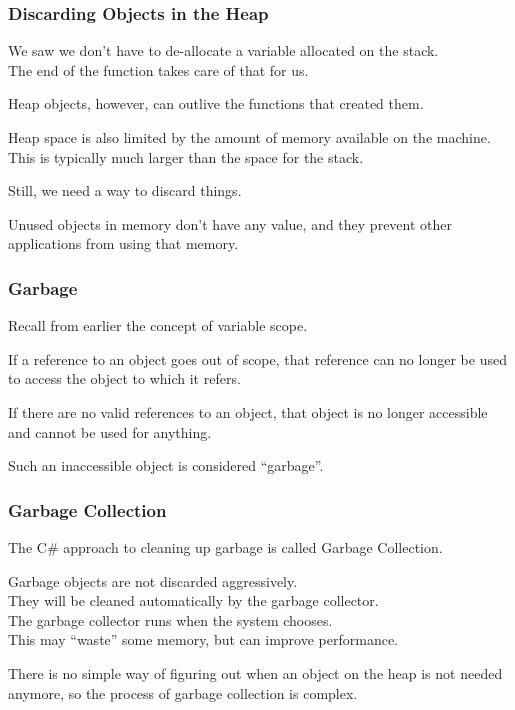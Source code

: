 \begin{frame}
\frametitle{Discarding Objects in the Heap}

We saw we don't have to de-allocate a variable allocated on the stack.\\
\quad The end of the function takes care of that for us.

Heap objects, however, can outlive the functions that created them.

Heap space is also limited by the amount of memory available on the machine. This is typically much larger than the space for the stack. 

Still, we need a way to discard things. 

Unused objects in memory don't have any value, and they prevent other applications from using that memory.

\end{frame}

\begin{frame}
\frametitle{Garbage}

Recall from earlier the concept of variable scope.

If a reference to an object goes out of scope, that reference can no longer be used to access the object to which it refers.

If there are no valid references to an object, that object is no longer accessible and cannot be used for anything.

Such an inaccessible object is considered ``garbage''.

\end{frame}

\begin{frame}
\frametitle{Garbage Collection}

The C\# approach to cleaning up garbage is called \alert{Garbage Collection}.

Garbage objects are not discarded aggressively.\\
\quad They will be cleaned automatically by the garbage collector.\\
\quad The garbage collector runs when the system chooses.\\
\quad This may ``waste'' some memory, but can improve performance.

There is no simple way of figuring out when an object on the heap is not needed anymore, so the process of garbage collection is complex.

\end{frame}


